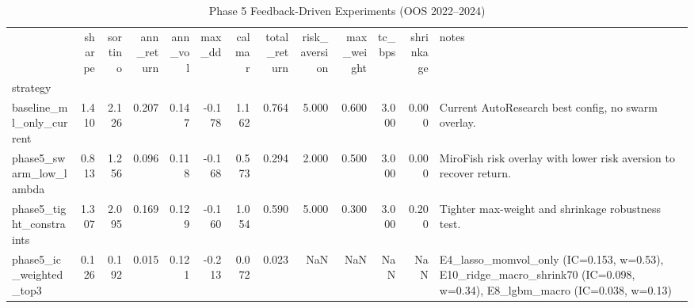 \begin{table}
\caption{Phase 5 Feedback-Driven Experiments (OOS 2022--2024)}
\label{tab:phase5_feedback}
\begin{tabular}{lrrrrrrrrrrrl}
\toprule
 & sharpe & sortino & ann_return & ann_vol & max_dd & calmar & total_return & risk_aversion & max_weight & tc_bps & shrinkage & notes \\
strategy &  &  &  &  &  &  &  &  &  &  &  &  \\
\midrule
baseline_ml_only_current & 1.410 & 2.126 & 0.207 & 0.147 & -0.178 & 1.162 & 0.764 & 5.000 & 0.600 & 3.000 & 0.000 & Current AutoResearch best config, no swarm overlay. \\
phase5_swarm_low_lambda & 0.813 & 1.256 & 0.096 & 0.118 & -0.168 & 0.573 & 0.294 & 2.000 & 0.500 & 3.000 & 0.000 & MiroFish risk overlay with lower risk aversion to recover return. \\
phase5_tight_constraints & 1.307 & 2.095 & 0.169 & 0.129 & -0.160 & 1.054 & 0.590 & 5.000 & 0.300 & 3.000 & 0.200 & Tighter max-weight and shrinkage robustness test. \\
phase5_ic_weighted_top3 & 0.126 & 0.192 & 0.015 & 0.121 & -0.213 & 0.072 & 0.023 & NaN & NaN & NaN & NaN & E4_lasso_momvol_only (IC=0.153, w=0.53), E10_ridge_macro_shrink70 (IC=0.098, w=0.34), E8_lgbm_macro (IC=0.038, w=0.13) \\
\bottomrule
\end{tabular}
\end{table}
